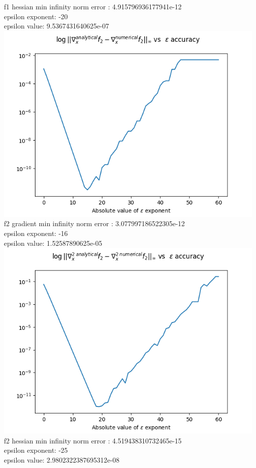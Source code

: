 \documentclass[12pt]{article}
\begin{document}
f1 hessian min infinity norm error : 4.915796936177941e-12\\ 
epsilon exponent: -20\\
epsilon value: 9.5367431640625e-07\\
\includegraphics[scale=0.7]{f2_grad_plot}\\
f2 gradient min infinity norm error : 3.077997186522305e-12\\
epsilon exponent: -16\\
epsilon value: 1.52587890625e-05\\
\includegraphics[scale=0.7]{f2_hessian_plot}\\
f2 hessian min infinity norm error : 4.519438310732465e-15\\
epsilon exponent: -25\\
epsilon value: 2.9802322387695312e-08\\
\end{document}

